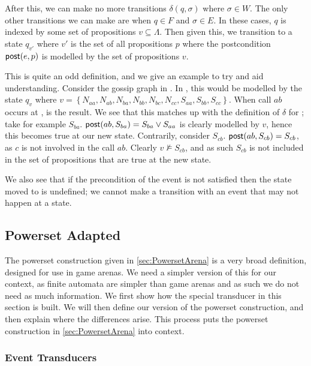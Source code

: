 \documentclass[12pt, a4paper]{article}
\begin{document}
After this, we can make no more transitions $\delta(q, \sigma)$ where $\sigma
\in W$. The only other transitions we can make are when $q \in F$ and $\sigma
\in E$. In these cases, $q$ is indexed by some set of propositions $v \subseteq
\Lambda$. Then given this, we transition to a state $q_{v'}$ where $v'$ is the
set of all propositions $p$ where the postcondition $\textsf{post}(e, p)$ is modelled by
the set of propositions $v$. 

This is quite an odd definition, and we give an example to try and aid
understanding. Consider the gossip graph in . In
\mestar, this would be modelled by the state $q_v$ where $v = \left\{ N_{aa},
  N_{ab}, N_{ba}, N_{bb}, N_{bc}, N_{cc}, S_{aa}, S_{bb}, S_{cc} \right\}$. When
call $ab$ occurs at ,  is the
result. We see that this matches up with the definition of $\delta$ for \mestar;
take for example $S_{ba}$. $\textsf{post}(ab, S_{ba}) = S_{ba} \lor S_{aa}$ is clearly
modelled by $v$, hence this becomes true at our new state. Contrarily, consider
$S_{cb}$. $\textsf{post}(ab, S_{cb}) = S_{cb}$, as $c$ is not involved in the call $ab$.
Clearly $v \not \models S_{cb}$, and as such $S_{cb}$ is not included in the set
of propositions that are true at the new state.

We also see that if the precondition of the event is not satisfied then the
state moved to is undefined; we cannot make a transition with an event that may
not happen at a state. 

\bigskip 


\subsection{Powerset Adapted}
\label{sec:PowersetAdapted}

The powerset construction given in \ref{sec:PowersetArena} is a very broad
definition, designed for use in game arenas. We need a simpler version of this
for our context, as finite automata are simpler than game arenas and as such we
do not need as much information. We first show how the special transducer in
this section is built. We will then define our version of the powerset
construction, and then explain where the differences arise. This process puts
the powerset construction in \ref{sec:PowersetArena} into context.

\subsubsection{Event Transducers}
\end{document}
